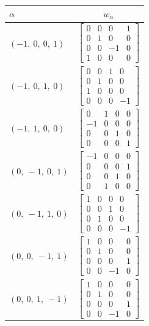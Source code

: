 \documentclass[11pt]{article}
\newcommand{\noi}{\noindent}
\theoremstyle{definition}
\begin{document}
\noi \noindent \begin{longtable}{|l|c|}
    \hline
    $\alpha$ & $w_\alpha$ \\
    \hline
    \endhead
    $\left( -1, \  0, \  0, \  1\right)$ & ${\left[\begin{matrix}0 & 0 & 0 & 1\\0 & 1 & 0 & 0\\0 & 0 & -1 & 0\\1 & 0 & 0 & 0\end{matrix}\right]}$ \\
    \hline
    $\left( -1, \  0, \  1, \  0\right)$ & ${\left[\begin{matrix}0 & 0 & 1 & 0\\0 & 1 & 0 & 0\\1 & 0 & 0 & 0\\0 & 0 & 0 & -1\end{matrix}\right]}$ \\
    \hline
    $\left( -1, \  1, \  0, \  0\right)$ & ${\left[\begin{matrix}0 & 1 & 0 & 0\\-1 & 0 & 0 & 0\\0 & 0 & 1 & 0\\0 & 0 & 0 & 1\end{matrix}\right]}$ \\
    \hline
    $\left( 0, \  -1, \  0, \  1\right)$ & ${\left[\begin{matrix}-1 & 0 & 0 & 0\\0 & 0 & 0 & 1\\0 & 0 & 1 & 0\\0 & 1 & 0 & 0\end{matrix}\right]}$ \\
    \hline
    $\left( 0, \  -1, \  1, \  0\right)$ & ${\left[\begin{matrix}1 & 0 & 0 & 0\\0 & 0 & 1 & 0\\0 & 1 & 0 & 0\\0 & 0 & 0 & -1\end{matrix}\right]}$ \\
    \hline
    $\left( 0, \  0, \  -1, \  1\right)$ & ${\left[\begin{matrix}1 & 0 & 0 & 0\\0 & 1 & 0 & 0\\0 & 0 & 0 & 1\\0 & 0 & -1 & 0\end{matrix}\right]}$ \\
    \hline
    $\left( 0, \  0, \  1, \  -1\right)$ & ${\left[\begin{matrix}1 & 0 & 0 & 0\\0 & 1 & 0 & 0\\0 & 0 & 0 & 1\\0 & 0 & -1 & 0\end{matrix}\right]}$ \\

\end{longtable}
\end{document}
